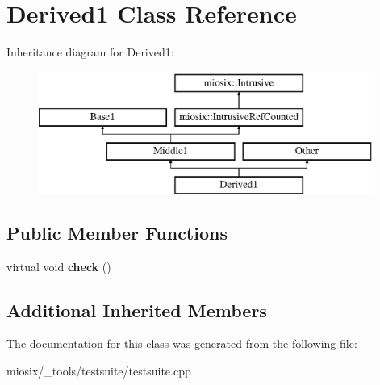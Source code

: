 \hypertarget{class_derived1}{\section{Derived1 Class Reference}
\label{class_derived1}
}
Inheritance diagram for Derived1\-:\begin{figure}[H]
\begin{center}
\leavevmode
\includegraphics[height=4.000000cm]{class_derived1}
\end{center}
\end{figure}
\subsection*{Public Member Functions}
\begin{DoxyCompactItemize}
\item 
\hypertarget{class_derived1_ac7a13f5db43a2210d88975098a5bdd7a}{virtual void {\bfseries check} ()}\label{class_derived1_ac7a13f5db43a2210d88975098a5bdd7a}

\end{DoxyCompactItemize}
\subsection*{Additional Inherited Members}


The documentation for this class was generated from the following file\-:\begin{DoxyCompactItemize}
\item 
miosix/\-\_\-tools/testsuite/testsuite.\-cpp\end{DoxyCompactItemize}
